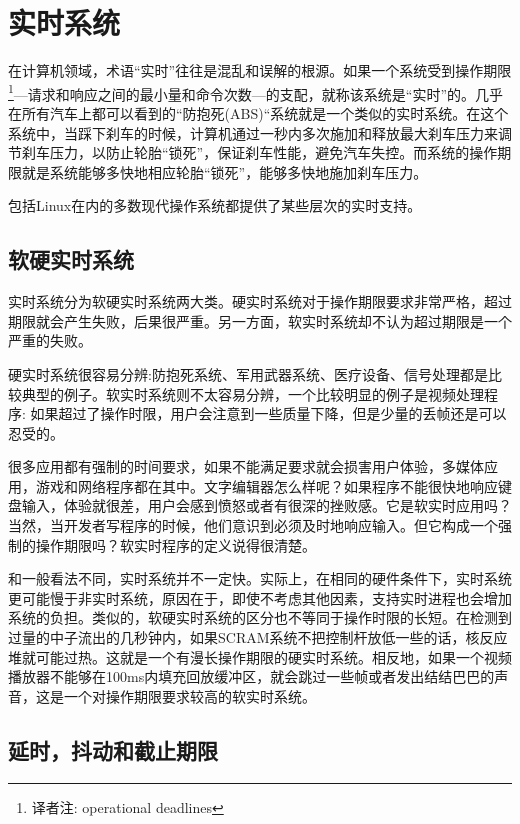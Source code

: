 \section{实时系统}

  在计算机领域，术语“实时”往往是混乱和误解的根源。如果一个系统受到操作期限\footnote[1]{译者注: operational deadlines}---请求和响应之间的最小量和命令次数---的支配，就称该系统是“实时”的。几乎在所有汽车上都可以看到的“防抱死(ABS)“系统就是一个类似的实时系统。在这个系统中，当踩下刹车的时候，计算机通过一秒内多次施加和释放最大刹车压力来调节刹车压力，以防止轮胎“锁死”，保证刹车性能，避免汽车失控。而系统的操作期限就是系统能够多快地相应轮胎“锁死”，能够多快地施加刹车压力。

  包括Linux在内的多数现代操作系统都提供了某些层次的实时支持。

\subsection{软硬实时系统}

  实时系统分为软硬实时系统两大类。硬实时系统对于操作期限要求非常严格，超过期限就会产生失败，后果很严重。另一方面，软实时系统却不认为超过期限是一个严重的失败。

  硬实时系统很容易分辨:防抱死系统、军用武器系统、医疗设备、信号处理都是比较典型的例子。软实时系统则不太容易分辨，一个比较明显的例子是视频处理程序: 如果超过了操作时限，用户会注意到一些质量下降，但是少量的丢帧还是可以忍受的。

  很多应用都有强制的时间要求，如果不能满足要求就会损害用户体验，多媒体应用，游戏和网络程序都在其中。文字编辑器怎么样呢？如果程序不能很快地响应键盘输入，体验就很差，用户会感到愤怒或者有很深的挫败感。它是软实时应用吗？当然，当开发者写程序的时候，他们意识到必须及时地响应输入。但它构成一个强制的操作期限吗？软实时程序的定义说得很清楚。

  和一般看法不同，实时系统并不一定快。实际上，在相同的硬件条件下，实时系统更可能慢于非实时系统，原因在于，即使不考虑其他因素，支持实时进程也会增加系统的负担。类似的，软硬实时系统的区分也不等同于操作时限的长短。在检测到过量的中子流出的几秒钟内，如果SCRAM系统不把控制杆放低一些的话，核反应堆就可能过热。这就是一个有漫长操作期限的硬实时系统。相反地，如果一个视频播放器不能够在100ms内填充回放缓冲区，就会跳过一些帧或者发出结结巴巴的声音，这是一个对操作期限要求较高的软实时系统。

\subsection{延时，抖动和截止期限}

